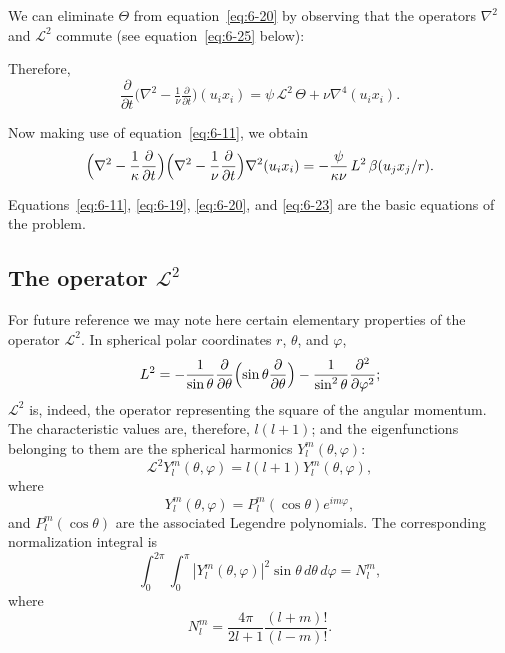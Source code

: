 We can eliminate $\Theta$ from equation~\eqref{eq:6-20} by observing that the operators
$\nabla^2$ and $\mathscr{L}^2$ commute (see equation~\eqref{eq:6-25} below):

Therefore,
\begin{equation}\label{eq:6-22}
\frac{\partial}{\partial t}\bigl(\nabla^2 - \tfrac{1}{\nu}\tfrac{\partial}{\partial t}\bigr)(u_i x_i) = \psi\,\mathscr{L}^2\,\Theta + \nu\nabla^4(u_i x_i).
\end{equation}

Now making use of equation~\eqref{eq:6-11}, we obtain
\begin{equation}\label{eq:6-23}
\Bigl(\nabla^2-\frac{1}{\kappa}\frac{\partial}{\partial t}\Bigr)\Bigl(\nabla^2 - \frac{1}{\nu}\frac{\partial}{\partial t}\Bigr)\nabla^2(u_i x_i) = -\frac{\psi}{\kappa\nu}\,\mathscr{L}^2\,\beta(u_j x_j/r).
\end{equation}

Equations~\eqref{eq:6-11}, \eqref{eq:6-19}, \eqref{eq:6-20}, and \eqref{eq:6-23} are the basic equations of the
problem.

\subsection{The operator $\mathscr{L}^2$}\label{sec:56a}
For future reference we may note here certain elementary properties
of the operator $\mathscr{L}^2$. In spherical polar coordinates $r$, $\theta$, and $\varphi$,
\begin{equation}\label{eq:6-25}
\mathscr{L}^2 = -\frac{1}{\sin\theta}\frac{\partial}{\partial\theta}\Bigl(\sin\theta\frac{\partial}{\partial\theta}\Bigr) - \frac{1}{\sin^2\theta}\frac{\partial^2}{\partial\varphi^2};
\end{equation}
$\mathscr{L}^2$ is, indeed, the operator representing the square of the angular
momentum. The characteristic values are, therefore, $l(l+1)$; and the
eigenfunctions belonging to them are the spherical harmonics $Y_l^m(\theta,\varphi)$:
\begin{equation}\label{eq:6-26}
\mathscr{L}^2 Y_l^m(\theta,\varphi) = l(l+1)Y_l^m(\theta,\varphi),
\end{equation}
where
\begin{equation}\label{eq:6-27}
Y_l^m(\theta,\varphi) = P_l^m(\cos\theta)e^{im\varphi},
\end{equation}
and $P_l^m(\cos\theta)$ are the associated Legendre polynomials. The corre\-sponding normalization integral is
\begin{equation}\label{eq:6-28}
\int_0^{2\pi}\!\!\int_0^{\pi} |Y_l^m(\theta,\varphi)|^2 \sin\theta\,d\theta\,d\varphi = N_l^m,
\end{equation}
where
\begin{equation}\label{eq:6-29}
N_l^m = \frac{4\pi}{2l+1}\frac{(l+m)!}{(l-m)!}.
\end{equation}

